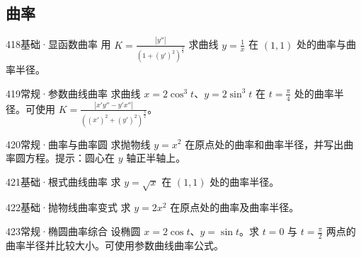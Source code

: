 \subsection{曲率}
\begin{exercise}{418}{基础·显函数曲率}
用 $K=\frac{|y''|}{(1+(y')^2)^{\frac{3}{2}}}$ 求曲线 $y=\frac{1}{x}$ 在 $(1,1)$ 处的曲率与曲率半径。
\end{exercise}
\begin{exercise}{419}{常规·参数曲线曲率}
求曲线 $x=2\cos^3t$、$y=2\sin^3t$ 在 $t=\frac{\pi}{4}$ 处的曲率半径。可使用 $K=\frac{|x'y''-y'x''|}{((x')^2+(y')^2)^{\frac{3}{2}}}$。
\end{exercise}
\begin{exercise}{420}{常规·曲率与曲率圆}
求抛物线 $y=x^2$ 在原点处的曲率和曲率半径，并写出曲率圆方程。提示：圆心在 $y$ 轴正半轴上。
\end{exercise}
\begin{exercise}{421}{基础·根式曲线曲率}
求 $y=\sqrt x$ 在 $(1,1)$ 处的曲率半径。
\end{exercise}
\begin{exercise}{422}{基础·抛物线曲率变式}
求 $y=2x^2$ 在原点处的曲率及曲率半径。
\end{exercise}
\begin{exercise}{423}{常规·椭圆曲率综合}
设椭圆 $x=2\cos t$、$y=\sin t$。求 $t=0$ 与 $t=\frac{\pi}{2}$ 两点的曲率半径并比较大小。可使用参数曲线曲率公式。
\end{exercise}
